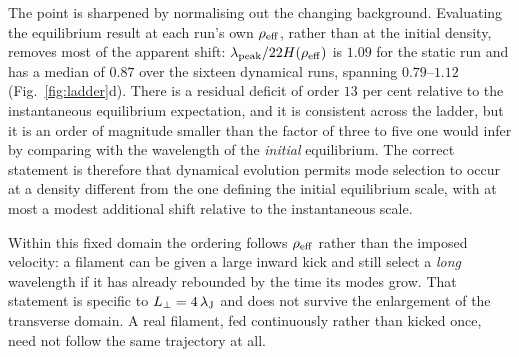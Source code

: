 \documentclass[usenatbib,twoside,twocolumn]{mnras}
\begin{document}
The point is sharpened by normalising out the changing background. Evaluating the equilibrium result at each run's own $\rho_{\rm eff}$, rather than at the initial density, removes most of the apparent shift: $\lambda_{\rm peak}/22H(\rho_{\rm eff})$ is $1.09$ for the static run and has a median of $0.87$ over the sixteen dynamical runs, spanning $0.79$--$1.12$ (Fig.~\ref{fig:ladder}d). There is a residual deficit of order $13$ per cent relative to the instantaneous equilibrium expectation, and it is consistent across the ladder, but it is an order of magnitude smaller than the factor of three to five one would infer by comparing with the wavelength of the \emph{initial} equilibrium. The correct statement is therefore that dynamical evolution permits mode selection to occur at a density different from the one defining the initial equilibrium scale, with at most a modest additional shift relative to the instantaneous scale.

Within this fixed domain the ordering follows $\rho_{\rm eff}$ rather than the imposed velocity: a filament can be given a large inward kick and still select a \emph{long} wavelength if it has already rebounded by the time its modes grow. That statement is specific to $L_\perp=4\,\lambda_{\rm J}$ and does not survive the enlargement of the transverse domain. A real filament, fed continuously rather than kicked once, need not follow the same trajectory at all.
\end{document}
